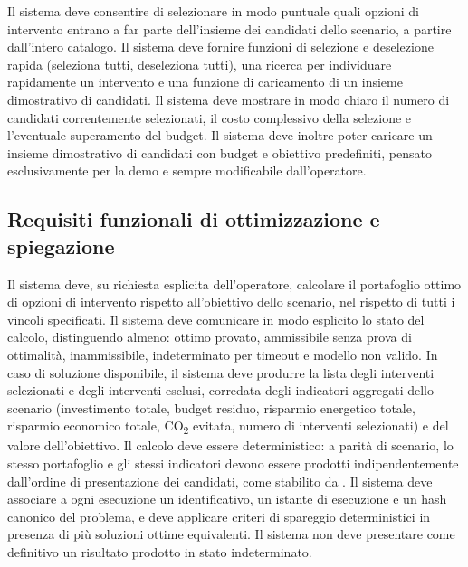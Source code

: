  \label{rf:candidati}
Il sistema deve consentire di selezionare in modo puntuale quali opzioni di intervento entrano a far parte dell'insieme dei candidati dello scenario, a partire dall'intero catalogo. Il sistema deve fornire funzioni di selezione e deselezione rapida (seleziona tutti, deseleziona tutti), una ricerca per individuare rapidamente un intervento e una funzione di caricamento di un insieme dimostrativo di candidati. Il sistema deve mostrare in modo chiaro il numero di candidati correntemente selezionati, il costo complessivo della selezione e l'eventuale superamento del budget. Il sistema deve inoltre poter caricare un insieme dimostrativo di candidati con budget e obiettivo predefiniti, pensato esclusivamente per la demo e sempre modificabile dall'operatore.

\subsection{Requisiti funzionali di ottimizzazione e spiegazione}

 \label{rf:ottimizzazione}
Il sistema deve, su richiesta esplicita dell'operatore, calcolare il portafoglio ottimo di opzioni di intervento rispetto all'obiettivo dello scenario, nel rispetto di tutti i vincoli specificati. Il sistema deve comunicare in modo esplicito lo stato del calcolo, distinguendo almeno: ottimo provato, ammissibile senza prova di ottimalità, inammissibile, indeterminato per timeout e modello non valido. In caso di soluzione disponibile, il sistema deve produrre la lista degli interventi selezionati e degli interventi esclusi, corredata degli indicatori aggregati dello scenario (investimento totale, budget residuo, risparmio energetico totale, risparmio economico totale, CO\textsubscript{2} evitata, numero di interventi selezionati) e del valore dell'obiettivo. Il calcolo deve essere deterministico: a parità di scenario, lo stesso portafoglio e gli stessi indicatori devono essere prodotti indipendentemente dall'ordine di presentazione dei candidati, come stabilito da . Il sistema deve associare a ogni esecuzione un identificativo, un istante di esecuzione e un hash canonico del problema, e deve applicare criteri di spareggio deterministici in presenza di più soluzioni ottime equivalenti. Il sistema non deve presentare come definitivo un risultato prodotto in stato indeterminato.

